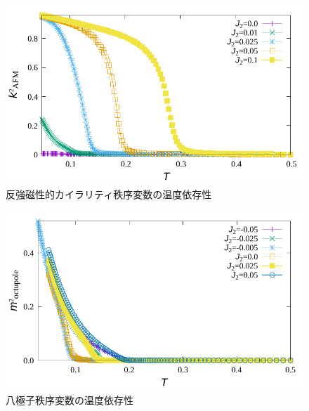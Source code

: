\documentclass[12pt,titlepage,dvipdfmx]{jarticle}
\begin{document}
\begin{figure}[H]
   \centering
   \includegraphics[width=12cm]{figure/afvc.pdf}
   \caption{反強磁性的カイラリティ秩序変数の温度依存性}
\end{figure}

\begin{figure}[H]
   \centering
   \includegraphics[width=12cm]{figure/octupole.pdf}
   \caption{八極子秩序変数の温度依存性}
\end{figure}

%

\end{document}
